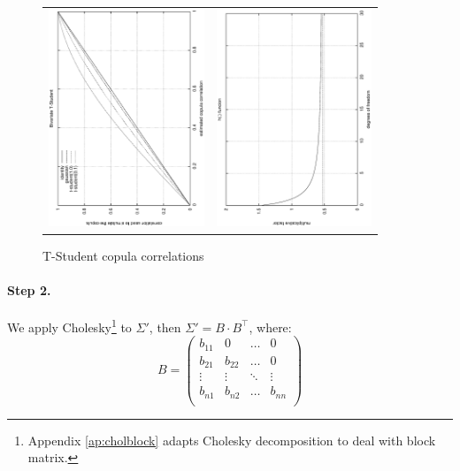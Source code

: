 \documentclass[a4paper,12pt,final]{article}
\begin{document}
\begin{figure}[!hbt]
\begin{center}
\begin{tabular}{cc}
\includegraphics[height=6.5cm, angle=-90]{./images/btsf.eps} &
\includegraphics[height=6.5cm, angle=-90]{./images/btsh.eps} \\
\end{tabular}
\caption{T-Student copula correlations}
\label{img:t-student-correlations}
\end{center}
\end{figure}

\FloatBarrier

\paragraph{Step 2.} We apply Cholesky\footnote{Appendix \ref{ap:cholblock} adapts Cholesky 
decomposition to deal with block matrix.} to $\Sigma'$, then $\Sigma' = B \cdot B^{\top}$, 
where:
\begin{displaymath}
B = 
\left(
\begin{array}{cccc}
b_{11}   & 0        & \ldots & 0       \\
b_{21}   & b_{22}   & \ldots & 0       \\
\vdots  & \vdots  & \ddots & \vdots    \\
b_{n1}   & b_{n2}   & \ldots & b_{nn}  \\
\end{array}
\right)
\end{displaymath}
\end{document}
